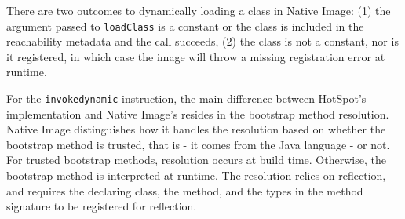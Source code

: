 There are two outcomes to dynamically loading a class in Native Image: (1) the argument passed to \verb|loadClass| is a constant or the class is included in the reachability metadata and the call succeeds, (2) the class is not a constant, nor is it registered, in which case the image will throw a missing registration error at runtime.

For the \verb|invokedynamic| instruction, the main difference between HotSpot's implementation and Native Image's resides in the bootstrap method resolution. Native Image distinguishes how it handles the resolution based on whether the bootstrap method is trusted, that is - it comes from the Java language - or not. For trusted bootstrap methods, resolution occurs at build time. Otherwise, the bootstrap method is interpreted at runtime. The resolution relies on reflection, and requires the declaring class, the method, and the types in the method signature to be registered for reflection.